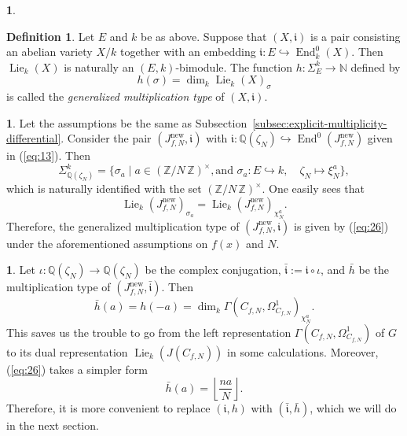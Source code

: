 \documentclass{amsart}[11pt]
\theoremstyle{definition}
\newtheorem{defn}[thm]{Definition}
\newtheorem{sect}[thm]{}
\numberwithin{equation}{section}
\theoremstyle{notitle}
\begin{document}
\begin{sect}
  \begin{defn} 
    Let $E$ and $k$ be as above. Suppose that $(X, {\mathfrak{i}})$ is a pair
    consisting an abelian variety $X/k$ together with an embedding ${\mathfrak{i}}:
    E\hookrightarrow \operatorname{End}_k^0(X)$. Then $\operatorname{Lie}_k(X)$ is naturally an $(E,
    k)$-bimodule. The function $h: \Sigma_E^k\to {\mathbb{N}}$ defined by 
\[ h(\sigma)= \dim_k \operatorname{Lie}_k(X)_\sigma\]
is called the \textit{generalized multiplication type} of $(X, {\mathfrak{i}})$. 
  \end{defn}

  \begin{sect}\label{subsec:def-generalized-mul-type}
    Let the assumptions be the same as
    Subsection~\ref{subsec:explicit-multiplicity-differential}. Consider
    the pair $(J_{f,N}^{\mathrm{new}}, {\mathfrak{i}})$ with ${\mathfrak{i}}:
    {\mathbb{Q}}(\zeta_N)\hookrightarrow \operatorname{End}^0( J_{f,N}^{\mathrm{new}})$ given in
    (\ref{eq:13}). Then
    \[ \Sigma_{{\mathbb{Q}}(\zeta_N)}^k = \{ \sigma_a\mid a\in {(\mathbb{Z}/ {N}\, \mathbb{Z})^\times}, \text{
      and } \sigma_a : E\hookrightarrow k, \quad \zeta_N\mapsto
    \xi_N^a\}, \] which is naturally identified with the set
    ${(\mathbb{Z}/ {N}\, \mathbb{Z})^\times}$. One easily sees
    that \[\operatorname{Lie}_k(J_{f,N}^{\mathrm{new}})_{\sigma_a}=\operatorname{Lie}_k(J_{f,N}^{\mathrm{new}})_{\chi_N^a}.\]
    Therefore, the generalized multiplication type of $(J_{f,N}^{\mathrm{new}},
    {\mathfrak{i}})$ is given by (\ref{eq:26}) under the aforementioned
    assumptions on $f(x)$ and $N$.
  \end{sect}

  \begin{sect}
    Let $\iota: {\mathbb{Q}}(\zeta_N)\to {\mathbb{Q}}(\zeta_N)$ be the complex
    conjugation, $\bar{\mathfrak{i}}:={\mathfrak{i}}\circ \iota$, and $\bar{h}$ be the
    multiplication type of $(J_{f,N}^{\mathrm{new}}, \bar{\mathfrak{i}})$. Then 
    \begin{equation}
      \label{eq:33}
      \bar{h}(a)=h(-a)= \dim_k \Gamma(C_{f,N},
      \Omega_{C_{f,N}}^1)_{\chi_N^a}. 
    \end{equation}
    This saves us the trouble to go from the left representation
    $\Gamma(C_{f,N}, \Omega_{C_{f,N}}^1)$ of $G$ to its dual
    representation $\operatorname{Lie}_k(J(C_{f,N}))$ in some
    calculations. Moreover, (\ref{eq:26}) takes a simpler form
    \begin{equation}
      \label{eq:34}
      \bar{h}(a)= {\left\lfloor {\frac{na}{N}} \right\rfloor}. 
    \end{equation}
Therefore, it is more convenient to replace $({\mathfrak{i}}, h)$ with
$(\bar{\mathfrak{i}}, \bar{h})$, which we will do in the next section. 
  \end{sect}


\end{sect}
\end{document}

